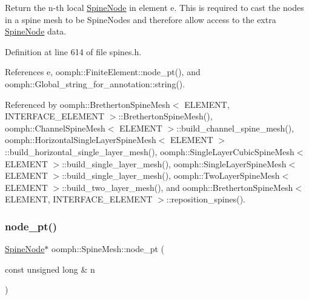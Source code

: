 Return the n-\/th local \hyperlink{classoomph_1_1SpineNode}{Spine\+Node} in element e. This is required to cast the nodes in a spine mesh to be Spine\+Nodes and therefore allow access to the extra \hyperlink{classoomph_1_1SpineNode}{Spine\+Node} data. 



Definition at line 614 of file spines.\+h.



References e, oomph\+::\+Finite\+Element\+::node\+\_\+pt(), and oomph\+::\+Global\+\_\+string\+\_\+for\+\_\+annotation\+::string().



Referenced by oomph\+::\+Bretherton\+Spine\+Mesh$<$ E\+L\+E\+M\+E\+N\+T, I\+N\+T\+E\+R\+F\+A\+C\+E\+\_\+\+E\+L\+E\+M\+E\+N\+T $>$\+::\+Bretherton\+Spine\+Mesh(), oomph\+::\+Channel\+Spine\+Mesh$<$ E\+L\+E\+M\+E\+N\+T $>$\+::build\+\_\+channel\+\_\+spine\+\_\+mesh(), oomph\+::\+Horizontal\+Single\+Layer\+Spine\+Mesh$<$ E\+L\+E\+M\+E\+N\+T $>$\+::build\+\_\+horizontal\+\_\+single\+\_\+layer\+\_\+mesh(), oomph\+::\+Single\+Layer\+Cubic\+Spine\+Mesh$<$ E\+L\+E\+M\+E\+N\+T $>$\+::build\+\_\+single\+\_\+layer\+\_\+mesh(), oomph\+::\+Single\+Layer\+Spine\+Mesh$<$ E\+L\+E\+M\+E\+N\+T $>$\+::build\+\_\+single\+\_\+layer\+\_\+mesh(), oomph\+::\+Two\+Layer\+Spine\+Mesh$<$ E\+L\+E\+M\+E\+N\+T $>$\+::build\+\_\+two\+\_\+layer\+\_\+mesh(), and oomph\+::\+Bretherton\+Spine\+Mesh$<$ E\+L\+E\+M\+E\+N\+T, I\+N\+T\+E\+R\+F\+A\+C\+E\+\_\+\+E\+L\+E\+M\+E\+N\+T $>$\+::reposition\+\_\+spines().

\mbox{\label{classoomph_1_1SpineMesh_a55bfdb79c8cf307c1b36e4948e5dc298}} 
\subsubsection{\texorpdfstring{node\+\_\+pt()}{node\_pt()}}
{\footnotesize\ttfamily \hyperlink{classoomph_1_1SpineNode}{Spine\+Node}$\ast$ oomph\+::\+Spine\+Mesh\+::node\+\_\+pt (\begin{DoxyParamCaption}\item[{const unsigned long \&}]{n }\end{DoxyParamCaption})\hspace{0.3cm}{\ttfamily [inline]}}



